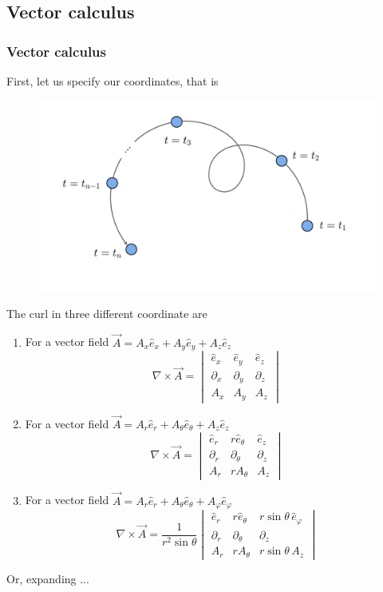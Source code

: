 \documentclass[11pt,]{beamer}
\begin{document}
\subsection{Vector calculus}
\begin{frame}
\frametitle{Vector calculus}
	First, let us specify our coordinates, that is
	\begin{figure}
	\includegraphics[page=10,width=1.0\textwidth]{imgs.pdf}
	\end{figure}
\end{frame}
\begin{frame}
	The curl in three different coordinate are
	\begin{enumerate}
	\item For a vector field $\vec{A} = A_x \hat{e}_x + A_y \hat{e}_y + A_z \hat{e}_z$
		\begin{equation}
		\nabla \times \vec{A} = 
		\begin{vmatrix}
		\hat{e}_x & \hat{e}_y & \hat{e}_z\\
		\partial_x & \partial_y & \partial_z\\
		A_x & A_y & A_z
		\end{vmatrix}
		\end{equation}
	\item For a vector field $\vec{A} = A_r \hat{e}_r + A_\theta \hat{e}_\theta + A_z \hat{e}_z$
		\begin{equation}
		\nabla \times \vec{A} = 
		\begin{vmatrix}
		\hat{e}_r & r\hat{e}_\theta & \hat{e}_z\\
		\partial_r & \partial_\theta & \partial_z\\
		A_r & r A_\theta & A_z
		\end{vmatrix}
		\end{equation}
	\item For a vector field $\vec{A} = A_r \hat{e}_r + A_\theta \hat{e}_\theta + A_\varphi \hat{e}_\varphi$
		\begin{equation}
		\nabla \times \vec{A} = 
		\frac{1}{r^2\sin\theta}\begin{vmatrix}
		\hat{e}_r & r\hat{e}_\theta & r\sin\theta\,\hat{e}_\varphi\\
		\partial_r & \partial_\theta & \partial_z\\
		A_r & r A_\theta & r\sin\theta\,A_z
		\end{vmatrix}
		\end{equation}
	\end{enumerate}
	Or, expanding ...
\end{frame}
\end{document}
